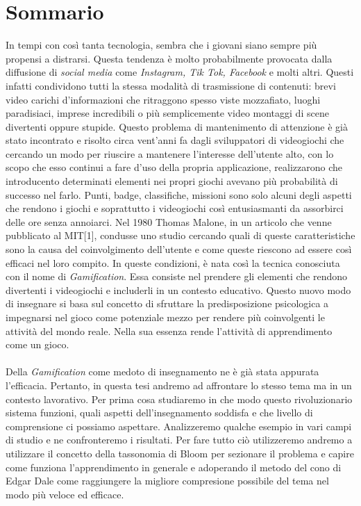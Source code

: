 \chapter*{Sommario}
\label{sommario}


In tempi con così tanta tecnologia, sembra che i giovani siano sempre più propensi a distrarsi. Questa tendenza è molto probabilmente provocata dalla diffusione di \textit{social media} come \textit{Instagram, Tik Tok, Facebook} e molti altri. Questi infatti condividono tutti la stessa modalità di trasmissione di contenuti: brevi video carichi d'informazioni che ritraggono spesso viste mozzafiato, luoghi paradisiaci, imprese incredibili o più semplicemente video montaggi di scene divertenti oppure stupide.
Questo problema di mantenimento di attenzione è già stato incontrato e risolto circa vent'anni fa dagli sviluppatori di videogiochi che cercando un modo per riuscire a mantenere l'interesse dell'utente alto, con lo scopo che esso continui a fare d'uso della propria applicazione, realizzarono che introducento determinati elementi nei propri giochi avevano più probabilità di successo nel farlo. Punti, badge, classifiche, missioni sono solo alcuni degli aspetti che rendono i giochi e soprattutto i videogiochi così entusiasmanti da assorbirci delle ore senza annoiarci.
Nel 1980 Thomas Malone, in un articolo che venne pubblicato al MIT[1], condusse uno studio cercando quali di queste caratteristiche sono la causa del coinvolgimento dell'utente e come queste riescono ad essere così efficaci nel loro compito. In queste condizioni, è nata così la tecnica conosciuta con il nome di \textit{Gamification}. Essa consiste nel prendere gli elementi che rendono divertenti i videogiochi e includerli in un contesto educativo. Questo nuovo modo di insegnare si basa sul concetto di sfruttare la predisposizione psicologica a impegnarsi nel gioco come potenziale mezzo per rendere più coinvolgenti le attività del mondo reale. Nella sua essenza rende l'attività di apprendimento come un gioco.
\\
\\
Della \textit{Gamification} come medoto di insegnamento ne è già stata appurata l'efficacia. Pertanto, in questa tesi andremo ad affrontare lo stesso tema ma in un contesto lavorativo. Per prima cosa studiaremo in che modo questo rivoluzionario sistema funzioni, quali aspetti dell'insegnamento soddisfa e che livello di comprensione ci possiamo aspettare. Analizzeremo qualche esempio in vari campi di studio e ne confronteremo i risultati. Per fare tutto ciò utilizzeremo andremo a utilizzare il concetto della tassonomia di Bloom per sezionare il problema e capire come funziona l'apprendimento in generale e adoperando il metodo del cono di Edgar Dale come raggiungere la migliore compresione possibile del tema nel modo più veloce ed efficace.
